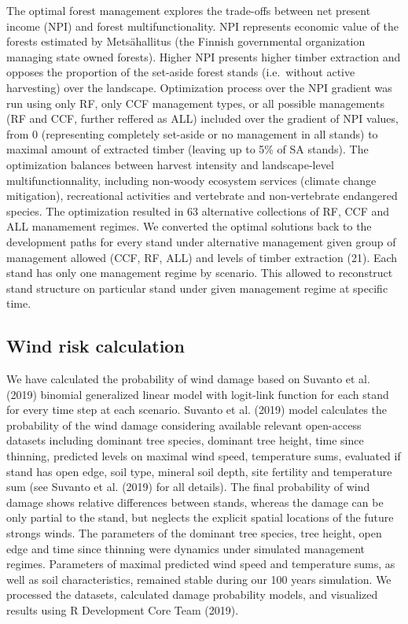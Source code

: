 \documentclass[]{elsarticle} %
\begin{document}
The optimal forest management explores the trade-offs between net
present income (NPI) and forest multifunctionality. NPI represents
economic value of the forests estimated by Metsähallitus (the Finnish
governmental organization managing state owned forests). Higher NPI
presents higher timber extraction and opposes the proportion of the
set-aside forest stands (i.e.~without active harvesting) over the
landscape. Optimization process over the NPI gradient was run using only
RF, only CCF management types, or all possible managements (RF and CCF,
further reffered as ALL) included over the gradient of NPI values, from
0 (representing completely set-aside or no management in all stands) to
maximal amount of extracted timber (leaving up to 5\% of SA stands). The
optimization balances between harvest intensity and landscape-level
multifunctionnality, including non-woody ecosystem services (climate
change mitigation), recreational activities and vertebrate and
non-vertebrate endangered species. The optimization resulted in 63
alternative collections of RF, CCF and ALL manamement regimes. We
converted the optimal solutions back to the development paths for every
stand under alternative management given group of management allowed
(CCF, RF, ALL) and levels of timber extraction (21). Each stand has only
one management regime by scenario. This allowed to reconstruct stand
structure on particular stand under given management regime at specific
time.

\subsection{Wind risk calculation}\label{wind-risk-calculation}

We have calculated the probability of wind damage based on Suvanto et
al. (2019) binomial generalized linear model with logit-link function
for each stand for every time step at each scenario. Suvanto et al.
(2019) model calculates the probability of the wind damage considering
available relevant open-access datasets including dominant tree species,
dominant tree height, time since thinning, predicted levels on maximal
wind speed, temperature sums, evaluated if stand has open edge, soil
type, mineral soil depth, site fertility and temperature sum (see
Suvanto et al. (2019) for all details). The final probability of wind
damage shows relative differences between stands, whereas the damage can
be only partial to the stand, but neglects the explicit spatial
locations of the future strongs winds. The parameters of the dominant
tree species, tree height, open edge and time since thinning were
dynamics under simulated management regimes. Parameters of maximal
predicted wind speed and temperature sums, as well as soil
characteristics, remained stable during our 100 years simulation. We
processed the datasets, calculated damage probability models, and
visualized results using R Development Core Team (2019).
\end{document}
